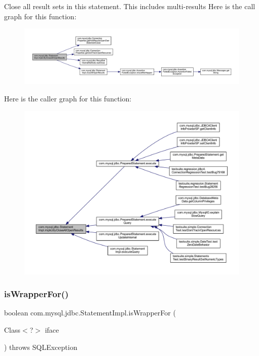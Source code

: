 Close all result sets in this statement. This includes multi-\/results Here is the call graph for this function\+:
\nopagebreak
\begin{figure}[H]
\begin{center}
\leavevmode
\includegraphics[width=350pt]{classcom_1_1mysql_1_1jdbc_1_1_statement_impl_aeb89691311bd70ba70c7e4bfd510a182_cgraph}
\end{center}
\end{figure}
Here is the caller graph for this function\+:
\nopagebreak
\begin{figure}[H]
\begin{center}
\leavevmode
\includegraphics[width=350pt]{classcom_1_1mysql_1_1jdbc_1_1_statement_impl_aeb89691311bd70ba70c7e4bfd510a182_icgraph}
\end{center}
\end{figure}
\mbox{\label{classcom_1_1mysql_1_1jdbc_1_1_statement_impl_a97ce8b90fd0b4404140b1fe9fbe3d3da}} 
\subsubsection{\texorpdfstring{is\+Wrapper\+For()}{isWrapperFor()}}
{\footnotesize\ttfamily boolean com.\+mysql.\+jdbc.\+Statement\+Impl.\+is\+Wrapper\+For (\begin{DoxyParamCaption}\item[{Class$<$?$>$}]{iface }\end{DoxyParamCaption}) throws S\+Q\+L\+Exception}

